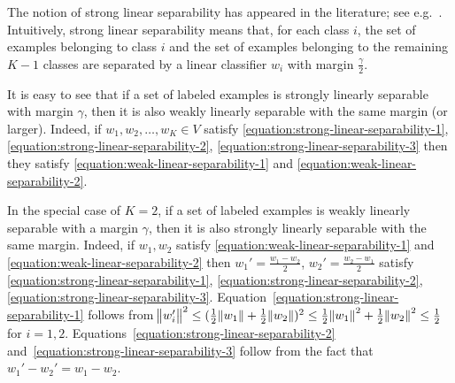 
The notion of strong linear separability has appeared in the literature; see
e.g.~\citet{Chen-Chen-Zhang-Chen-Zhang-2009}. Intuitively, strong linear
separability means that, for each class $i$, the set of examples belonging to
class $i$ and the set of examples belonging to the remaining $K-1$ classes are
separated by a linear classifier $w_i$ with margin $\frac{\gamma}{2}$.

It is easy to see that if a set of labeled examples is strongly linearly
separable with margin $\gamma$, then it is also weakly linearly separable with
the same margin (or larger). Indeed, if $w_1, w_2, \dots, w_K \in V$ satisfy
\eqref{equation:strong-linear-separability-1},
\eqref{equation:strong-linear-separability-2},
\eqref{equation:strong-linear-separability-3} then they satisfy
\eqref{equation:weak-linear-separability-1} and
\eqref{equation:weak-linear-separability-2}.

In the special case of $K=2$, if a set of labeled examples is weakly
linearly separable with a margin $\gamma$, then it is also strongly linearly
separable with the same margin. Indeed, if $w_1, w_2$ satisfy
\eqref{equation:weak-linear-separability-1} and
\eqref{equation:weak-linear-separability-2} then $w_1' = \frac{w_1 - w_2}{2}$,
$w_2' = \frac{w_2 - w_1}{2}$ satisfy
\eqref{equation:strong-linear-separability-1},
\eqref{equation:strong-linear-separability-2},
\eqref{equation:strong-linear-separability-3}.
Equation~\eqref{equation:strong-linear-separability-1} follows from
$\norm{w_i'}^2 \le (\frac{1}{2} \norm{w_1} + \frac{1}{2} \norm{w_2})^2 \le
\frac{1}{2}\norm{w_1}^2 + \frac{1}{2}\norm{w_2}^2 \le \frac{1}{2}$ for $i=1,2$.
Equations~\eqref{equation:strong-linear-separability-2}
and~\eqref{equation:strong-linear-separability-3} follow from the fact that
$w_1' - w_2' = w_1 - w_2$.

